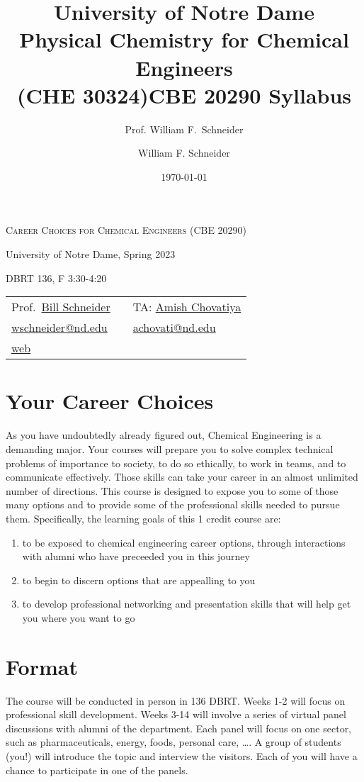 \documentclass[11pt]{article}
\title{University of Notre Dame\\Physical Chemistry for Chemical Engineers\\(CHE 30324)}
\author{Prof. William F.\ Schneider}
\author{William F. Schneider}
\date{\today}
\title{CBE 20290  Syllabus}
\begin{document}
\begin{OPTIONS}
\end{OPTIONS}

\begin{center}
\textsc{Career Choices for Chemical Engineers (CBE 20290)}

University of Notre Dame, Spring 2023

DBRT 136, F 3:30-4:20 
\end{center}

\begin{center}
\begin{tabular}{lll}
\hline
Prof.~\href{https://www.linkedin.com/in/william-schneider-570091a/}{Bill Schneider} &  & TA: \href{https://www.linkedin.com/in/amish-chovatiya/}{Amish Chovatiya}\\
\href{mailto:wschneider@nd.edu}{wschneider@nd.edu} &  & \href{mailto:achovati@nd.edu}{achovati@nd.edu}\\
\href{https://www.nd.edu/\~wschnei1}{web} &  & \\
\hline
\end{tabular}
\end{center}

\section{Your Career Choices}
\label{sec:org36e57e2}
As you have undoubtedly already figured out, Chemical Engineering is a demanding major. Your courses will prepare you to solve complex technical problems of importance to society, to do so ethically, to work in teams, and to communicate effectively.  Those skills can take your career in an almost unlimited number of directions. This course is designed to expose you to some of those many options and to provide some of the professional skills needed to pursue them. Specifically, the learning goals of this 1 credit course are:

\begin{enumerate}
\item to be exposed to chemical engineering career options, through interactions with alumni who have preceeded you in this journey
\item to begin to discern options that are appealling to you
\item to develop  professional networking and presentation skills that will help get you where you want to go
\end{enumerate}

\section{Format}
\label{sec:orgb4df967}
The course will be conducted in person in 136 DBRT.  Weeks 1-2 will focus on professional skill development. Weeks 3-14 will involve a series of virtual panel discussions with alumni of the department. Each panel will focus on one sector, such as pharmaceuticals, energy, foods, personal care, \ldots. A group of students (you!) will introduce the topic and interview the visitors. Each of you will have a chance to participate in one of the panels.
\newline
\end{document}
